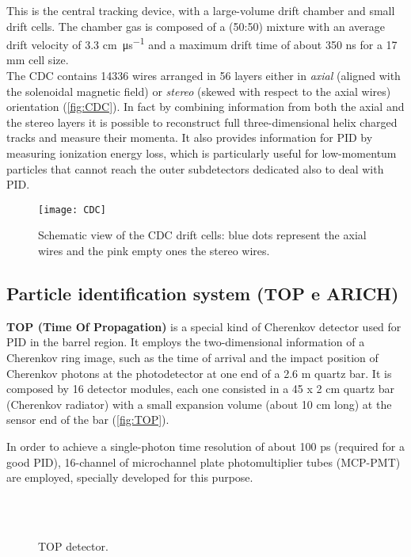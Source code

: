 This is the central tracking device, with a large-volume drift chamber and small drift cells. The chamber gas is composed of a  (50:50) mixture with an average drift velocity of 3.3 \unit{\centi\meter.\micro\second^{-1}} and a maximum drift time of about 350 ns for a 17 mm cell size.\\
The CDC contains 14336 wires arranged in 56 layers either in \emph{axial}  (aligned with the solenoidal magnetic field) or \emph{stereo} (skewed with respect to the axial wires) orientation (\autoref{fig:CDC}). 
In fact by combining information from both the axial and the stereo layers it is possible to reconstruct full three-dimensional helix charged tracks and measure their momenta.
It also provides information for PID by measuring ionization energy loss, which is particularly useful for low-momentum particles that cannot reach the outer subdetectors dedicated also to deal with PID.

\begin{figure}[h!]
\centering
\texttt{[image: CDC]}
\caption{Schematic view of the CDC drift cells: blue dots represent the axial wires and the pink empty ones the stereo wires.}
\label{fig:CDC}
\end{figure}


\subsection{Particle identification system (TOP e ARICH)}

\textbf{TOP (Time Of Propagation)} is a special kind of Cherenkov detector used for PID in the barrel region. It employs the two-dimensional information of a Cherenkov ring image, such as the time of arrival and the impact position of Cherenkov photons at the photodetector at one end of a 2.6 m quartz bar. It is composed by 16 detector modules, each one consisted in a 45 x 2 cm quartz bar (Cherenkov radiator) with a small expansion volume (about 10 cm long) at the sensor end of the bar (\autoref{fig:TOP}). 

In order to achieve a single-photon time resolution of about 100 ps (required for a good PID), 16-channel of microchannel plate photomultiplier tubes (MCP-PMT) are employed, specially developed for this purpose.\\

\begin{figure}[h!]
\centering
{}\\
\\
\caption{TOP detector.}
\label{fig:TOP}
\end{figure}

